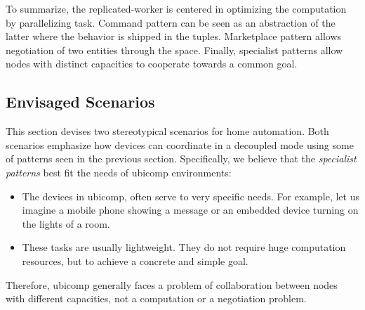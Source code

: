 To summarize, the replicated-worker is centered in optimizing the computation by parallelizing task.
Command pattern can be seen as an abstraction of the latter where the behavior is shipped in the tuples.
Marketplace pattern allows negotiation of two entities through the space.
Finally, specialist patterns allow nodes with distinct capacities to cooperate towards a common goal.





\subsection{Envisaged Scenarios}
\label{sec:envisaged_scenarios}

This section devises two stereotypical scenarios for home automation.
Both scenarios emphasize how devices can coordinate in a decoupled mode using some of patterns seen in the previous section. %
Specifically, we believe that the \emph{specialist patterns} best fit the needs of \ac{ubicomp} environments:
\begin{itemize}
  \item The devices in \ac{ubicomp}, often serve to very specific needs.
        For example, let us imagine a mobile phone showing a message or an embedded device turning on the lights of a room.
  \item These tasks are usually lightweight.
        They do not require huge computation resources, but to achieve a concrete and simple goal.
\end{itemize}
Therefore, \ac{ubicomp} generally faces a problem of collaboration between nodes with different capacities, not a computation or a negotiation problem. %



